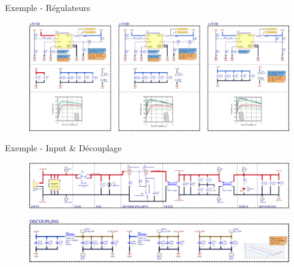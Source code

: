 \begin{frame}{Exemple - Régulateurs}
    \begin{figure}
        \includegraphics[width=\textwidth, height=0.75\textheight, keepaspectratio]{pictures/power-example-3v3.png}
    \end{figure}
\end{frame}


\begin{frame}{Exemple - Input \& Découplage}
    \begin{figure}
        \includegraphics[width=\textwidth, height=0.75\textheight, keepaspectratio]{pictures/power-example-input.png}
    \end{figure}

    \begin{figure}
        \includegraphics[width=\textwidth, height=0.75\textheight, keepaspectratio]{pictures/decoupling-example-eth.png}
    \end{figure}
\end{frame}